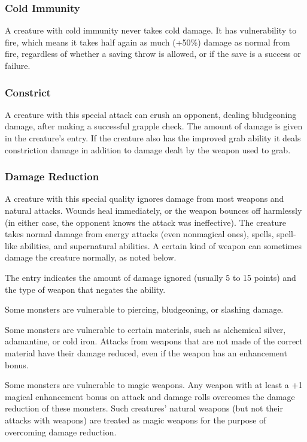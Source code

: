 \subsubsection{Cold Immunity}
A creature with cold immunity never takes cold damage. It has vulnerability to fire, which means it takes half again as much (+50\%) damage as normal from fire, regardless of whether a saving throw is allowed, or if the save is a success or failure.

\subsubsection{Constrict}
A creature with this special attack can crush an opponent, dealing bludgeoning damage, after making a successful grapple check. The amount of damage is given in the creature's entry. If the creature also has the improved grab ability it deals constriction damage in addition to damage dealt by the weapon used to grab.

\subsubsection{Damage Reduction}
A creature with this special quality ignores damage from most weapons and natural attacks. Wounds heal immediately, or the weapon bounces off harmlessly (in either case, the opponent knows the attack was ineffective). The creature takes normal damage from energy attacks (even nonmagical ones), spells, spell-like abilities, and supernatural abilities. A certain kind of weapon can sometimes damage the creature normally, as noted below.

The entry indicates the amount of damage ignored (usually 5 to 15 points) and the type of weapon that negates the ability.

Some monsters are vulnerable to piercing, bludgeoning, or slashing damage.

Some monsters are vulnerable to certain materials, such as alchemical silver, adamantine, or cold iron. Attacks from weapons that are not made of the correct material have their damage reduced, even if the weapon has an enhancement bonus.

Some monsters are vulnerable to magic weapons. Any weapon with at least a +1 magical enhancement bonus on attack and damage rolls overcomes the damage reduction of these monsters. Such creatures' natural weapons (but not their attacks with weapons) are treated as magic weapons for the purpose of overcoming damage reduction.

